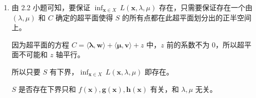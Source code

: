 \documentclass[11pt,letter,notitlepage]{article}
\begin{document}
\begin{solution}
	\begin{enumerate}
		\item 由 2.2 小题可知，要保证 $\inf_{\mathbf{x}\in X}\,L(\mathbf{x},\lambda,\mu)$ 存在，只需要保证存在一个由 $(\lambda,\mu)$ 和 $C$ 确定的超平面使得 $S$ 的所有点都在此超平面划分出的正半空间上。

		      因为超平面的方程 $C=\langle \mathbf{\lambda},\mathbf{w} \rangle + \langle \mathbf{\mu},\mathbf{v} \rangle + z$ 中，$z$ 前的系数不为 0，所以超平面不可能和 $z$ 轴平行。

		      所以只要 $S$ 有下界，$\inf_{\mathbf{x}\in X}\,L(\mathbf{x},\lambda,\mu)$ 即存在。

		      $S$ 是否存在下界只和 $f(\mathbf{x}),\mathbf{g}({\mathbf{x}}),\mathbf{h}(\mathbf{x})$ 有关，和 $\lambda,\mu$ 无关。


\end{enumerate}
\end{solution}
\end{document}
